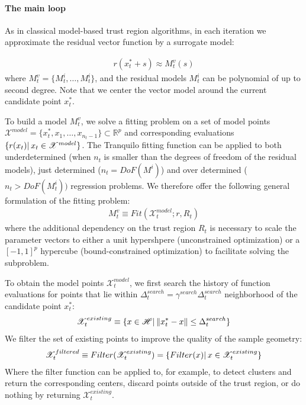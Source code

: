 \paragraph{The main loop} As in classical model-based trust region algorithms, in each iteration we approximate the residual vector function by a surrogate model:

\begin{align}
    r(x_t^*+s)\approx M_t^v(s)
    \label{eq:vec-model}
\end{align}
where $M_t^v = \{M_t^i,\dots,M_t^i\}$, and the residual models $M^i_t$ can be polynomial of up to second degree. Note that we center the vector model around the current candidate point $x_t^*$.


To build a model $M_t^v$, we solve a fitting problem on a set of model points $\mathcal{X}^{model}=\{x_t^*,x_1,\dots,x_{n_{t}-1}\}\subset\mathbb{R}^p$ and corresponding evaluations $\{r(x_t)|\hspace{0.2em} x_t\in\mathscr{X}^{model}\}$. The Tranquilo fitting function can be applied to both underdetermined (when $n_t$ is smaller than the degrees of freedom of the residual models), just determined ($n_t=DoF(M^i)$) and over determined ($n_t>DoF(M^i_t))$ regression problems. We therefore offer the following general formulation of the fitting problem:
\begin{align}
    M_t^v\equiv Fit(\mathcal{X}_t^{model};r,R_t)
    \label{eq:fit-model}
\end{align}
where the additional dependency on the trust region $R_t$ is necessary to scale the parameter vectors to either a unit hypershpere (unconstrained optimization) or a $[-1,1]^p$ hypercube (bound-constrained optimization) to facilitate solving the subproblem.

To obtain the model points $\mathcal{X}^{model}_t$, we first search the history of function evaluations for points that lie within $\Delta_t^{search}=\gamma^{search}\Delta_t^{search}$ neighborhood of the candidate point $x_t^*$:
\begin{align}
    \mathscr{X}^{existing}_t\equiv\{x\in\mathscr{H}|\hspace{0.2em}\lVert x^*_t-x\rVert\leq\Delta^{search}_t\}
    \label{eq:hist-search}
\end{align}
We filter the set of existing points to improve the quality of the sample geometry:
\begin{align}
    \mathscr{X}^{filtered}_t\equiv Filter (\mathscr{X}^{existing}_t) = \{ Filter (x)|\hspace{0.2em} x\in \mathscr{X}^{existing}_t\}
    \label{eq:filtering}
\end{align}
Where the filter function can be applied to, for example, to detect clusters and return the corresponding centers, discard points outside of the trust region, or do nothing by returning $\mathcal{X}_t^{existing}$.

